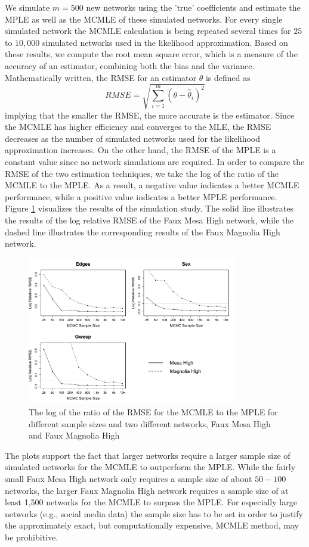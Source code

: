 \documentclass[10pt, conference, compsocconf]{IEEEtran}
\begin{document}
We simulate $m=500$ new networks using the 'true' coefficients and estimate the MPLE as well as the MCMLE of these simulated networks. For every single simulated network the MCMLE calculation is being repeated several times for $25$ to $10,000$ simulated networks used in the likelihood approximation.
Based on these results, we compute the root mean square error, which is a measure of the accuracy of an estimator, combining both the bias and the variance. Mathematically written, the RMSE for an estimator $\hat{\theta}$ is defined as 
$$RMSE = \sqrt{\sum_{i=1}^{m}(\theta - \hat{\theta}_i)^2}$$
implying that the smaller the RMSE, the more accurate is the estimator. Since the MCMLE has higher efficiency and converges to the MLE, the RMSE decreases as the number of simulated networks used for the likelihood approximation increases. On the other hand, the RMSE of the MPLE is a constant value since no network simulations are required. In order to compare the RMSE of the two estimation techniques, we take the log of the ratio of the MCMLE to the MPLE. As a result, a negative value indicates a better MCMLE performance, while a positive value indicates a better MPLE performance.\\[0.3cm] 
Figure \ref{rmse} visualizes the results of the simulation study. The solid line illustrates the results of the log relative RMSE of the Faux Mesa High network, while the dashed line illustrates the corresponding results of the Faux Magnolia High network. 
\begin{figure}[!t]
\centering
\includegraphics[width=3.6in]{RMSE_10k}
\caption{The log of the ratio of the RMSE for the MCMLE to the MPLE for different sample sizes and two different networks, Faux Mesa High and Faux Magnolia High}
\label{rmse}
\end{figure}
\noindent The plots support the fact that larger networks require a larger sample size of simulated networks for the MCMLE to outperform the MPLE. While the fairly small Faux Mesa High network only requires a sample size of about $50-100$ networks, the larger Faux Magnolia High network requires a sample size of at least 1,500 networks for the MCMLE to surpass the MPLE.  For especially large networks (e.g., social media data) the sample size has to be set in order to justify the approximately exact, but computationally expensive, MCMLE method, may be prohibitive.
\end{document}
